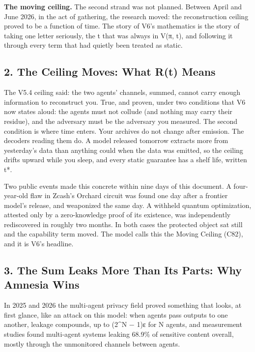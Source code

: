\documentclass[
  11pt,
]{article}
\begin{document}
\textbf{The moving ceiling.} The second strand was not planned. Between
April and June 2026, in the act of gathering, the research moved: the
reconstruction ceiling proved to be a function of time. The story of
V6's mathematics is the story of taking one letter seriously, the t that
was always in V(π, t), and following it through every term that had
quietly been treated as static.

\subsection{2. The Ceiling Moves: What R(t)
Means}\label{the-ceiling-moves-what-rt-means}

The V5.4 ceiling said: the two agents' channels, summed, cannot carry
enough information to reconstruct you. True, and proven, under two
conditions that V6 now states aloud: the agents must not collude (and
nothing may carry their residue), and the adversary must be the
adversary you measured. The second condition is where time enters. Your
archives do not change after emission. The decoders reading them do. A
model released tomorrow extracts more from yesterday's data than
anything could when the data was emitted, so the ceiling drifts upward
while you sleep, and every static guarantee has a shelf life, written
t*.

Two public events made this concrete within nine days of this document.
A four-year-old flaw in Zcash's Orchard circuit was found one day after
a frontier model's release, and weaponized the same day. A withheld
quantum optimization, attested only by a zero-knowledge proof of its
existence, was independently rediscovered in roughly two months. In both
cases the protected object sat still and the capability term moved. The
model calls this the Moving Ceiling (C82), and it is V6's headline.

\subsection{3. The Sum Leaks More Than Its Parts: Why Amnesia
Wins}\label{the-sum-leaks-more-than-its-parts-why-amnesia-wins}

In 2025 and 2026 the multi-agent privacy field proved something that
looks, at first glance, like an attack on this model: when agents pass
outputs to one another, leakage compounds, up to (2\^{}N − 1)ε for N
agents, and measurement studies found multi-agent systems leaking 68.9\%
of sensitive content overall, mostly through the unmonitored channels
between agents.
\end{document}
